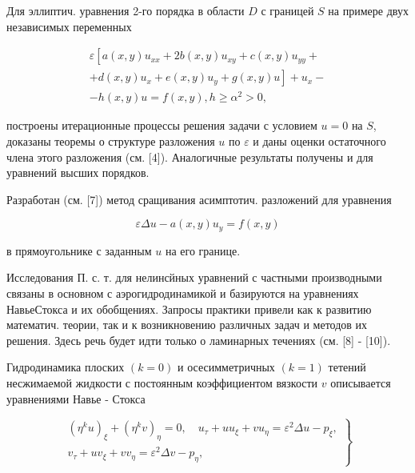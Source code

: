 \documentclass[10pt]{article}
\begin{document}
Для эллиптич. уравнения 2-го порядка в области $D$ с границей $S$ на примере двух независимых переменных



\[

\begin{gathered}

\varepsilon\left[a(x, y) u_{x x}+2 b(x, y) u_{x y}+c(x, y) u_{y y}+\right. \\

\left.+d(x, y) u_{x}+e(x, y) u_{y}+g(x, y) u\right]+u_{x}- \\

-h(x, y) u=f(x, y), h \geqslant \alpha^{2}>0,

\end{gathered}

\]



построены итерационные процессы решения задачи с условием $u=0$ на $S$, доказаны теоремы о структуре разложения $u$ по $\varepsilon$ и даны оценки остаточного члена этого разложения (см. [4]). Аналогичные результаты получены и для уравнений высших порядков.



Разработан (см. [7]) метод сращивания асимптотич. разложений для уравнения



\[

\varepsilon \Delta u-a(x, y) u_{y}=f(x, y)

\]



в прямоугольнике с заданным $u$ на его границе.



Исследования П. с. т. для нелинсйных уравнений с частными производными связаны в основном с аэрогидродинамикой и базируются на уравнениях НавьеСтокса и их обобщениях. Запросы практики привели как к развитию математич. теории, так и к возникновению различных задач и методов их решения. Здесь речь будет идти только о ламинарных течениях (см. [8] - [10]).



Гидродинамика плоских $(k=0)$ и осесимметричных $(k=1)$ тетений несжимаемой жидкости с постоянным коэффициентом вязкости $v$ описывается уравнениями Навье - Стокса



\[

\left.\begin{array}{c}

\left(\eta^{k} u\right)_{\xi}+\left(\eta^{k} v\right)_{\eta}=0, \quad u_{\tau}+u u_{\xi}+v u_{\eta}=\varepsilon^{2} \Delta u-p_{\xi}, \\

v_{\tau}+u v_{\xi}+v v_{\eta}=\varepsilon^{2} \Delta v-p_{\eta},

\end{array}\right\}

\]
\end{document}
